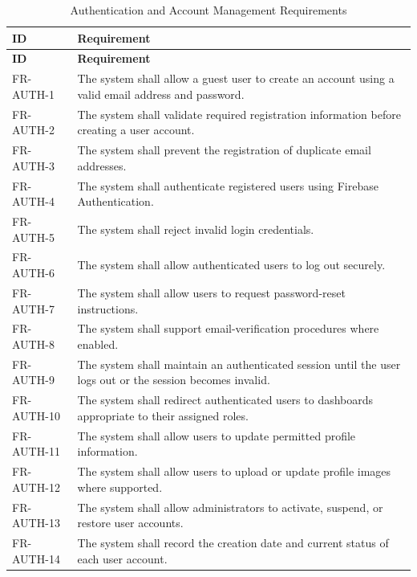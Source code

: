 \begin{longtable}{@{}p{2.4cm}p{11cm}@{}}
\caption{Authentication and Account Management Requirements} \label{tab:fr-auth} \\
\toprule \textbf{ID} & \textbf{Requirement} \\ \midrule
\endfirsthead
\toprule \textbf{ID} & \textbf{Requirement} \\ \midrule
\endhead
FR-AUTH-1 & The system shall allow a guest user to create an account using a valid email address and password. \\
FR-AUTH-2 & The system shall validate required registration information before creating a user account. \\
FR-AUTH-3 & The system shall prevent the registration of duplicate email addresses. \\
FR-AUTH-4 & The system shall authenticate registered users using Firebase Authentication. \\
FR-AUTH-5 & The system shall reject invalid login credentials. \\
FR-AUTH-6 & The system shall allow authenticated users to log out securely. \\
FR-AUTH-7 & The system shall allow users to request password-reset instructions. \\
FR-AUTH-8 & The system shall support email-verification procedures where enabled. \\
FR-AUTH-9 & The system shall maintain an authenticated session until the user logs out or the session becomes invalid. \\
FR-AUTH-10 & The system shall redirect authenticated users to dashboards appropriate to their assigned roles. \\
FR-AUTH-11 & The system shall allow users to update permitted profile information. \\
FR-AUTH-12 & The system shall allow users to upload or update profile images where supported. \\
FR-AUTH-13 & The system shall allow administrators to activate, suspend, or restore user accounts. \\
FR-AUTH-14 & The system shall record the creation date and current status of each user account. \\
\bottomrule
\end{longtable}

